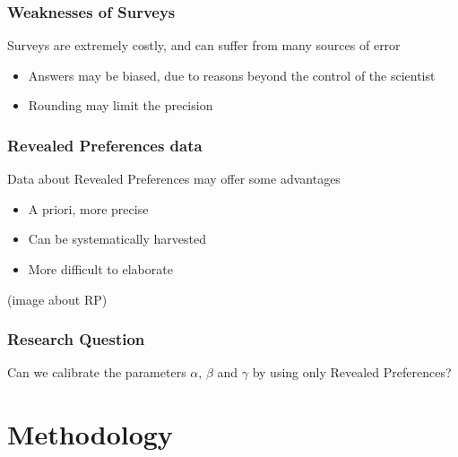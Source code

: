 \documentclass[hyperref={pdfpagelabels=false}]{beamer}
\begin{document}
\begin{frame}
  \frametitle{Weaknesses of Surveys}
  Surveys are extremely costly, and can suffer from many sources of error
  \begin{itemize}
  \item Answers may be biased, due to reasons beyond the control of the scientist
  \item Rounding may limit the precision
  \end{itemize}

\end{frame}
\begin{frame}
  \frametitle{Revealed Preferences data}
  Data about Revealed Preferences may offer some advantages
  \begin{itemize}
  \item A priori, more precise
  \item Can be systematically harvested
  \item More difficult to elaborate
  \end{itemize}
  (image about RP)
\end{frame}

\begin{frame}
  \frametitle{Research Question}
  Can we calibrate the parameters \(\alpha\), \(\beta\) and \(\gamma\) by using only Revealed Preferences?
\end{frame}

\section{Methodology}
\begin{frame}
  \tableofcontents[currentsection]
\end{frame}
\end{document}
